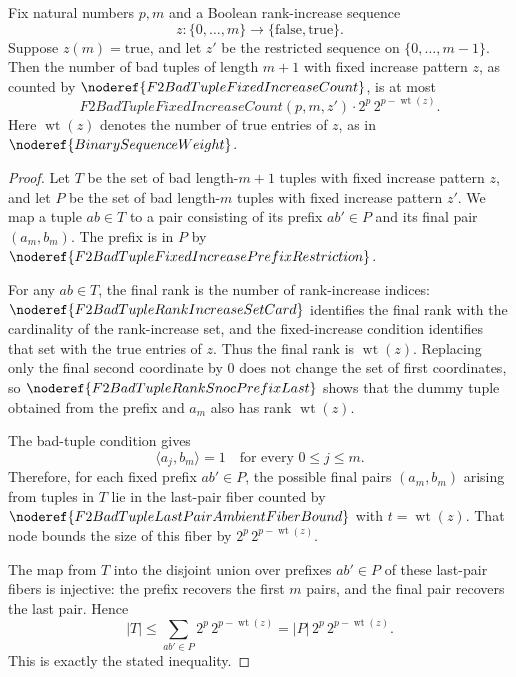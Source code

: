 \begin{helper}
Fix natural numbers \(p,m\) and a Boolean rank-increase sequence
\[
  z:\{0,\ldots,m\}\to\{\mathrm{false},\mathrm{true}\}.
\]
Suppose \(z(m)=\mathrm{true}\), and let \(z'\) be the restricted sequence on
\(\{0,\ldots,m-1\}\). Then the number of bad tuples of length \(m+1\) with
fixed increase pattern \(z\), as counted by
\(\noderef{F2BadTupleFixedIncreaseCount}\), is at most
\[
  F2BadTupleFixedIncreaseCount(p,m,z')\cdot
  2^p\,2^{p-\operatorname{wt}(z)}.
\]
Here \(\operatorname{wt}(z)\) denotes the number of true entries of \(z\), as in
\(\noderef{BinarySequenceWeight}\).
\end{helper}
\begin{proof}
Let \(T\) be the set of bad length-\(m+1\) tuples with fixed increase pattern
\(z\), and let \(P\) be the set of bad length-\(m\) tuples with fixed increase
pattern \(z'\). We map a tuple \(ab\in T\) to a pair consisting of its prefix
\(ab'\in P\) and its final pair \((a_m,b_m)\). The prefix is in \(P\) by
\(\noderef{F2BadTupleFixedIncreasePrefixRestriction}\).

For any \(ab\in T\), the final rank is the number of rank-increase indices:
\(\noderef{F2BadTupleRankIncreaseSetCard}\) identifies the final rank with the
cardinality of the rank-increase set, and the fixed-increase condition
identifies that set with the true entries of \(z\). Thus the final rank is
\(\operatorname{wt}(z)\). Replacing only the final second coordinate by \(0\)
does not change the set of first coordinates, so
\(\noderef{F2BadTupleRankSnocPrefixLast}\) shows that the dummy tuple obtained
from the prefix and \(a_m\) also has rank \(\operatorname{wt}(z)\).

The bad-tuple condition gives
\[
  \langle a_j,b_m\rangle=1
  \quad\text{for every }0\le j\le m.
\]
Therefore, for each fixed prefix \(ab'\in P\), the possible final pairs
\((a_m,b_m)\) arising from tuples in \(T\) lie in the last-pair fiber counted by
\(\noderef{F2BadTupleLastPairAmbientFiberBound}\) with
\(t=\operatorname{wt}(z)\). That node bounds the size of this fiber by
\(2^p\,2^{p-\operatorname{wt}(z)}\).

The map from \(T\) into the disjoint union over prefixes \(ab'\in P\) of these
last-pair fibers is injective: the prefix recovers the first \(m\) pairs, and
the final pair recovers the last pair. Hence
\[
  |T|
  \le \sum_{ab'\in P} 2^p\,2^{p-\operatorname{wt}(z)}
  = |P|\,2^p\,2^{p-\operatorname{wt}(z)}.
\]
This is exactly the stated inequality.
\end{proof}
